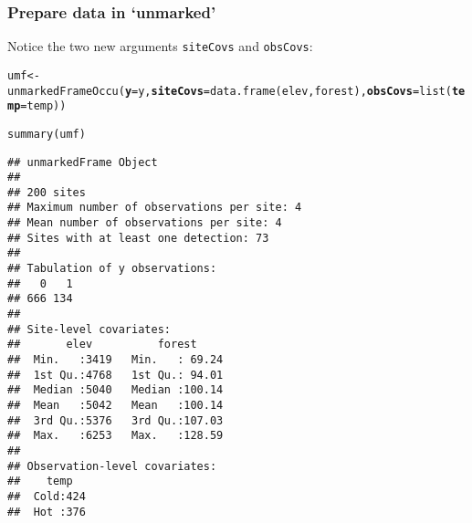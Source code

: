 \documentclass[color=usenames,dvipsnames]{beamer}\usepackage[]{graphicx}\usepackage[]{xcolor}
\makeatletter
\newcommand{\hldef}[1]{\textcolor[rgb]{0,0,0}{#1}}%
\newcommand{\hlkwb}[1]{\textcolor[rgb]{0,0.341,0.682}{#1}}%
\newcommand{\hlkwc}[1]{\textcolor[rgb]{0,0,0}{\textbf{#1}}}%
\newcommand{\hlkwd}[1]{\textcolor[rgb]{0.004,0.004,0.506}{#1}}%
\newenvironment{kframe}{%
 \def\at@end@of@kframe{}%
 \ifinner\ifhmode%
  \def\at@end@of@kframe{\end{minipage}}%
  \begin{minipage}{\columnwidth}%
 \fi\fi%
 \def\FrameCommand##1{\hskip\@totalleftmargin \hskip-\fboxsep
 \colorbox{shadecolor}{##1}\hskip-\fboxsep
     \hskip-\linewidth \hskip-\@totalleftmargin \hskip\columnwidth}%
 \MakeFramed {\advance\hsize-\width
   \@totalleftmargin\z@ \linewidth\hsize
   \@setminipage}}%
 {\par\unskip\endMakeFramed%
 \at@end@of@kframe}
\newenvironment{knitrout}{}{} %
\newcommand{\inr}[1]{\colorbox{inlinecolor}{\texttt{#1}}}
\makeatother
\begin{document}
\begin{frame}[fragile]
  \frametitle{Prepare data in `unmarked'}
  \small
Notice the two new arguments \inr{siteCovs} and \inr{obsCovs}: 
\begin{knitrout}\tiny
{}\color{fgcolor}\begin{kframe}
\begin{alltt}
\hldef{umf} \hlkwb{<-} \hlkwd{unmarkedFrameOccu}\hldef{(}\hlkwc{y}\hldef{=y,} \hlkwc{siteCovs}\hldef{=}\hlkwd{data.frame}\hldef{(elev,forest),} \hlkwc{obsCovs}\hldef{=}\hlkwd{list}\hldef{(}\hlkwc{temp}\hldef{=temp))}
\end{alltt}
\end{kframe}
\end{knitrout}
\pause
\begin{knitrout}\tiny
{}\color{fgcolor}\begin{kframe}
\begin{alltt}
\hlkwd{summary}\hldef{(umf)}
\end{alltt}
\begin{verbatim}
## unmarkedFrame Object
## 
## 200 sites
## Maximum number of observations per site: 4 
## Mean number of observations per site: 4 
## Sites with at least one detection: 73 
## 
## Tabulation of y observations:
##   0   1 
## 666 134 
## 
## Site-level covariates:
##       elev          forest      
##  Min.   :3419   Min.   : 69.24  
##  1st Qu.:4768   1st Qu.: 94.01  
##  Median :5040   Median :100.14  
##  Mean   :5042   Mean   :100.14  
##  3rd Qu.:5376   3rd Qu.:107.03  
##  Max.   :6253   Max.   :128.59  
## 
## Observation-level covariates:
##    temp    
##  Cold:424  
##  Hot :376
\end{verbatim}
\end{kframe}
\end{knitrout}
\end{frame}
\end{document}
